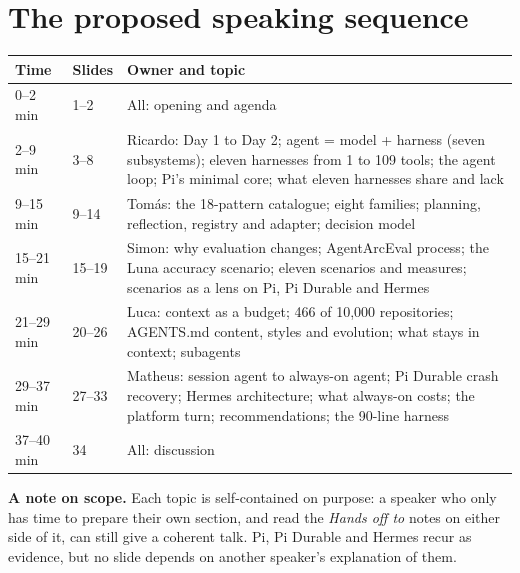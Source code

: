 \documentclass[12pt,a4paper]{article}
\begin{document}
\section{The proposed speaking sequence}
\begin{tabularx}{\textwidth}{@{}p{}p{}X@{}}
\toprule
\textbf{Time} & \textbf{Slides} & \textbf{Owner and topic}\\
\midrule
0--2 min & 1--2 & All: opening and agenda\\
2--9 min & 3--8 & Ricardo: Day 1 to Day 2; agent = model + harness (seven subsystems); eleven harnesses from 1 to 109 tools; the agent loop; Pi's minimal core; what eleven harnesses share and lack\\
9--15 min & 9--14 & Tomás: the 18-pattern catalogue; eight families; planning, reflection, registry and adapter; decision model\\
15--21 min & 15--19 & Simon: why evaluation changes; AgentArcEval process; the Luna accuracy scenario; eleven scenarios and measures; scenarios as a lens on Pi, Pi Durable and Hermes\\
21--29 min & 20--26 & Luca: context as a budget; 466 of 10,000 repositories; AGENTS.md content, styles and evolution; what stays in context; subagents\\
29--37 min & 27--33 & Matheus: session agent to always-on agent; Pi Durable crash recovery; Hermes architecture; what always-on costs; the platform turn; recommendations; the 90-line harness\\
37--40 min & 34 & All: discussion\\
\bottomrule
\end{tabularx}

\textbf{A note on scope.} Each topic is self-contained on purpose: a speaker who only has time to prepare their own section, and read the \emph{Hands off to} notes on either side of it, can still give a coherent talk. Pi, Pi Durable and Hermes recur as evidence, but no slide depends on another speaker's explanation of them.
\end{document}
